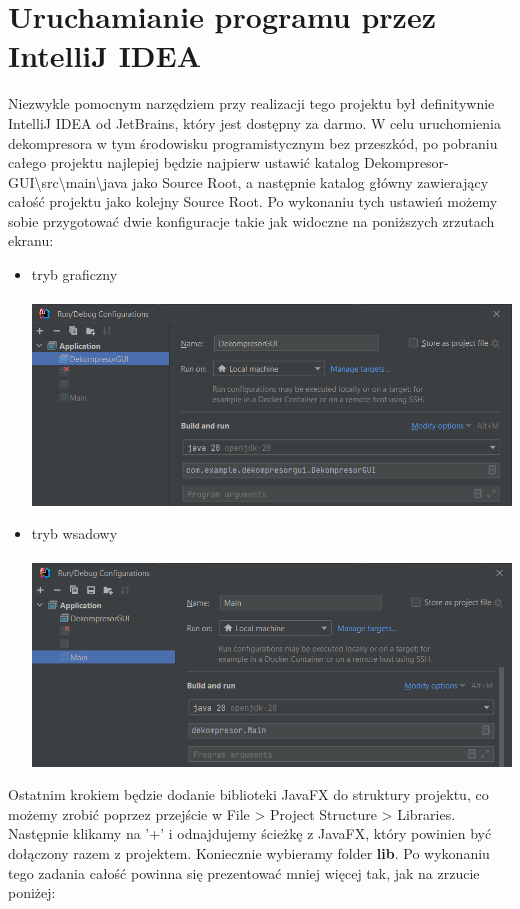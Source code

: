 \documentclass[]{article}
\begin{document}
\section{Uruchamianie programu przez IntelliJ IDEA}\label{header-n256}
Niezwykle pomocnym narzędziem przy realizacji tego projektu był definitywnie IntelliJ IDEA od JetBrains, który jest dostępny za darmo. W celu uruchomienia dekompresora w tym środowisku programistycznym bez przeszkód, po pobraniu całego projektu najlepiej będzie najpierw ustawić katalog Dekompresor-GUI\textbackslash src\textbackslash main\textbackslash java jako Source Root, a następnie katalog główny zawierający całość projektu jako kolejny Source Root. Po wykonaniu tych ustawień możemy sobie przygotować dwie konfiguracje takie jak widoczne na poniższych zrzutach ekranu:
\begin{itemize}
\item
tryb graficzny\\\\
\includegraphics[width=\textwidth]{config1.png}
\newpage
\item
tryb wsadowy\\\\
\includegraphics[width=\textwidth]{config2.png}
\end{itemize}
Ostatnim krokiem będzie dodanie biblioteki JavaFX do struktury projektu, co możemy zrobić poprzez przejście w File > Project Structure > Libraries. Następnie klikamy na '+' i odnajdujemy ścieżkę z JavaFX, który powinien być dołączony razem z projektem. Koniecznie wybieramy folder \textbf{lib}. Po wykonaniu tego zadania całość powinna się prezentować mniej więcej tak, jak na zrzucie poniżej:\\
\end{document}
